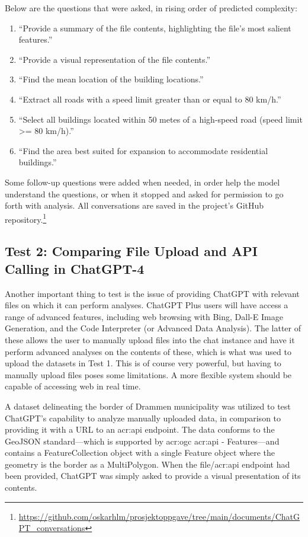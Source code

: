 Below are the questions that were asked, in rising order of predicted complexity:

\begin{enumerate}
    \item \enquote{Provide a summary of the file contents, highlighting the file's most salient features.}
    \item \enquote{Provide a visual representation of the file contents.}
    \item \enquote{Find the mean location of the building locations.}
    \item \enquote{Extract all roads with a speed limit greater than or equal to 80 km/h.}
    \item \enquote{Select all buildings located within 50 metes of a high-speed road (speed limit >= 80 km/h).}
    \item \enquote{Find the area best suited for expansion to accommodate residential buildings.}
\end{enumerate}
\label{enum:gpt-gis-questions}

\noindent Some follow-up questions were added when needed, in order help the model understand the questions, or when it stopped and asked for permission to go forth with analysis. All conversations are saved in the project's GitHub repository.\footnote{\url{https://github.com/oskarhlm/prosjektoppgave/tree/main/documents/ChatGPT_conversations}}

\subsection{Test 2: Comparing File Upload and API Calling in ChatGPT-4}

Another important thing to test is the issue of providing ChatGPT with relevant files on which it can perform analyses. ChatGPT Plus users will have access a range of advanced features, including web browsing with Bing, Dall-E Image Generation, and the Code Interpreter (or Advanced Data Analysis). The latter of these allows the user to manually upload files into the chat instance and have it perform advanced analyses on the contents of these, which is what was used to upload the datasets in Test 1. This is of course very powerful, but having to manually upload files poses some limitations. A more flexible system should be capable of accessing web  in real time.

A dataset delineating the border of Drammen municipality was utilized to test ChatGPT's capability to analyze manually uploaded data, in comparison to providing it with a URL to an \acrshort{acr:api} endpoint. The data conforms to the GeoJSON standard---which is supported by \acrshort{acr:ogc} \acrshort{acr:api} - Features---and contains a FeatureCollection object with a single Feature object where the geometry is the border as a MultiPolygon. When the file/\acrshort{acr:api} endpoint had been provided, ChatGPT was simply asked to provide a visual presentation of its contents.

